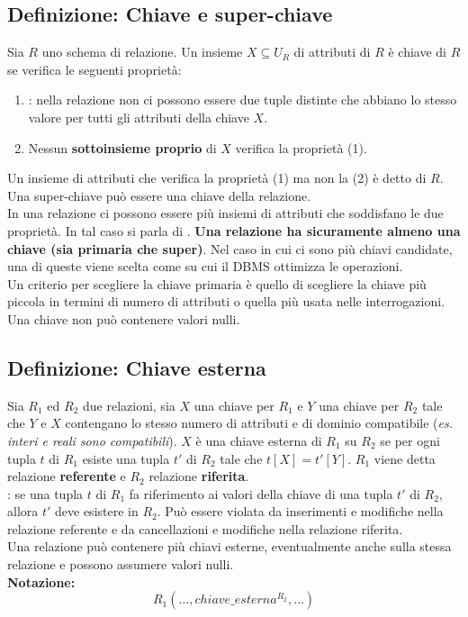 \documentclass[12pt, a4paper]{report}
\begin{document}
            \subsection{Definizione: Chiave e super-chiave}
                Sia $R$ uno schema di relazione. Un insieme $X\subseteq U_{R}$ di attributi di $R$ è chiave di $R$ se verifica le seguenti proprietà:
                \begin{enumerate}
                    \item {}: nella relazione non ci possono essere due tuple distinte che abbiano lo stesso valore per tutti gli attributi della chiave $X$.
                    \item Nessun \textbf{sottoinsieme proprio} di $X$ verifica la proprietà (1).
                \end{enumerate}
                Un insieme di attributi che verifica la proprietà (1) ma non la (2) è detto  di $R$. Una super-chiave può essere una chiave della relazione.\\
                In una relazione ci possono essere più insiemi di attributi che soddisfano le due proprietà. In tal caso si parla di . \textbf{Una relazione ha sicuramente almeno una chiave (sia primaria che super)}. Nel caso in cui ci sono più chiavi candidate, una di queste viene scelta come  su cui il DBMS ottimizza le operazioni.\\
                Un criterio per scegliere la chiave primaria è quello di scegliere la chiave più piccola in termini di numero di attributi o quella più usata nelle interrogazioni. Una chiave non può contenere valori nulli.
            \subsection{Definizione: Chiave esterna}
                Sia $R_{1}$ ed $R_{2}$ due relazioni, sia $X$ una chiave per $R_{1}$ e $Y$ una chiave per $R_{2}$ tale che $Y$ e $X$ contengano lo stesso numero di attributi e di dominio compatibile (\textit{es. interi e reali sono compatibili}). $X$ è una chiave esterna di $R_{1}$ su $R_{2}$ se per ogni tupla $t$ di $R_{1}$ esiste una tupla $t'$ di $R_{2}$ tale che $t[X]=t'[Y]$. $R_{1}$ viene detta relazione \textbf{referente} e $R_{2}$ relazione \textbf{riferita}.\\
                : se una tupla $t$ di $R_{1}$ fa riferimento ai valori della chiave di una tupla $t'$ di $R_{2}$, allora $t'$ deve esistere in $R_{2}$. Può essere violata da inserimenti e modifiche nella relazione referente e da cancellazioni e modifiche nella relazione riferita.\\
                Una relazione può contenere più chiavi esterne, eventualmente anche sulla stessa relazione e possono assumere valori nulli.\\
                \textbf{Notazione:}
                \begin{equation*}
                    R_{1}\left(\dots,chiave\_esterna^{R_{2}},\dots\right)
                \end{equation*}
\end{document}
